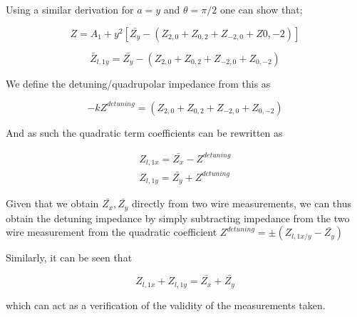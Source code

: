 Using a similar derivation for $a=y$ and $\theta = \pi/2$ one can show that;

\begin{equation}
Z = A_{1} + y^{2}\left[\bar{Z_{y}} - \left(Z_{2,0} + Z_{0,2} + Z_{-2,0} + Z{0,-2}\right) \right]
\end{equation}

\begin{equation}
\bar{Z}_{l,1y} = \bar{Z_{y}} - \left(Z_{2,0} + Z_{0,2} + Z_{-2,0} + Z_{0,-2}\right)
\end{equation}

We define the detuning/quadrupolar impedance from this as

\begin{equation}
-kZ^{detuning} = \left(Z_{2,0} + Z_{0,2} + Z_{-2,0} + Z_{0,-2}\right)
\end{equation}

And as such the quadratic term coefficients can be rewritten as

\begin{align}
Z_{l,1x} = \bar{Z_{x}} - Z^{detuning} \\
Z_{l,1y} = \bar{Z_{y}} + Z^{detuning}
\end{align}

Given that we obtain $\bar{Z_{x}}, \bar{Z_{y}}$ directly from two wire measurements, we can thus obtain the detuning impedance by simply subtracting impedance from the two wire measurement from the quadratic coefficient $Z^{detuning} = \pm \left( Z_{l,1x/y} - \bar{Z_{y}} \right)$

Similarly, it can be seen that 

\begin{equation}
Z_{l,1x} + Z_{l,1y} = \bar{Z_{x}} + \bar{Z_{y}}
\end{equation}

which can act as a verification of the validity of the measurements taken.